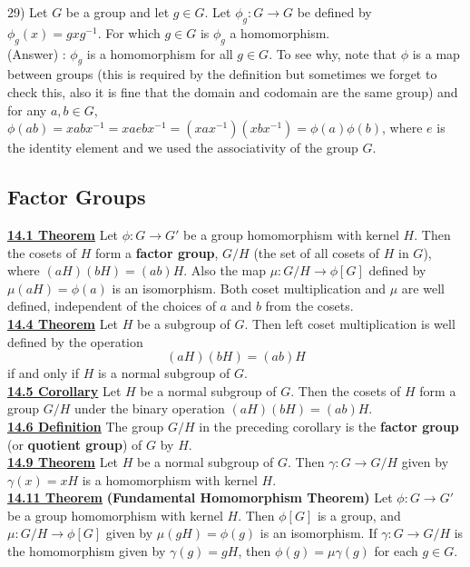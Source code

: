 \documentclass[12pt, letterpaper]{article}
\begin{document}
29) Let $G$ be a group and let $g \in G$. Let $\phi_g : G \rightarrow G$ be defined by $\phi_g(x) = gxg^{-1}$. For which $g \in G$ is $\phi_g$ a homomorphism. \\

(Answer) : $\phi_g$ is a homomorphism for all $g \in G$. To see why, note that $\phi$ is a map between groups (this is required by the definition but sometimes we forget to check this, also it is fine that the domain and codomain are the same group) and for any $a,b \in G$, $\phi(ab) = xabx^{-1} = xaebx^{-1} = (xax^{-1})(xbx^{-1}) = \phi(a)\phi(b)$, where $e$ is the identity element and we used the associativity of the group $G$. \\

\subsection{Factor Groups} 

\noindent \underline{\bf 14.1 Theorem} Let $\phi : G \rightarrow G'$ be a group homomorphism with kernel $H$. Then the cosets of $H$ form a {\bf factor group}, $G / H$ (the set of all cosets of $H$ in $G$), where $(aH)(bH) = (ab)H$. Also the map $\mu : G/H \rightarrow \phi[G]$ defined by $\mu(aH) = \phi(a)$ is an isomorphism. Both coset multiplication and $\mu$ are well defined, independent of the choices of $a$ and $b$ from the cosets. \\

\noindent \underline{\bf 14.4 Theorem} Let $H$ be a subgroup of $G$. Then left coset multiplication is well defined by the operation $$(aH)(bH) = (ab)H$$ if and only if $H$ is a normal subgroup of $G$. \\

\noindent \underline{\bf 14.5 Corollary} Let $H$ be a normal subgroup of $G$. Then the cosets of $H$ form a group $G/H$ under the binary operation $(aH)(bH) = (ab)H$. \\

\noindent \underline{\bf 14.6 Definition} The group $G/H$ in the preceding corollary is the {\bf factor group} (or {\bf quotient group}) of $G$ by $H$. \\

\noindent \underline{\bf 14.9 Theorem} Let $H$ be a normal subgroup of $G$. Then $\gamma : G \rightarrow G/H$ given by $\gamma(x) = xH$ is a homomorphism with kernel $H$. \\

\noindent \underline{\bf 14.11 Theorem} {\bf (Fundamental Homomorphism Theorem)}  Let $\phi : G \rightarrow G'$ be a group homomorphism with kernel $H$. Then $\phi[G]$ is a group, and $\mu : G/H \rightarrow \phi[G]$ given by $\mu (gH) = \phi(g)$ is an isomorphism. If $\gamma : G \rightarrow G/H$ is the homomorphism given by $\gamma(g) = gH$, then $\phi(g) = \mu \gamma (g) $ for each $g \in G$. \\
\end{document}
